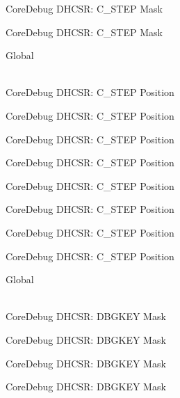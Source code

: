\begin{DoxyRefList}
\label{deprecated__deprecated000487}%
%
Core\+Debug DHCSR\+: C\+\_\+\+STEP Mask 

\label{deprecated__deprecated000589}%
%
Core\+Debug DHCSR\+: C\+\_\+\+STEP Mask  
\item[{\parbox[t]{\linewidth}{Global \doxylink{group___c_m_s_i_s___core_debug_gae1fc39e80de54c0339cbb1b298a9f0f9}{Core\+Debug\+\_\+\+DHCSR\+\_\+\+C\+\_\+\+STEP\+\_\+\+Pos} }}]\hfill \\
\label{deprecated__deprecated000035}%
%
Core\+Debug DHCSR\+: C\+\_\+\+STEP Position 

\label{deprecated__deprecated000123}%
%
Core\+Debug DHCSR\+: C\+\_\+\+STEP Position 

\label{deprecated__deprecated000179}%
%
Core\+Debug DHCSR\+: C\+\_\+\+STEP Position 

\label{deprecated__deprecated000262}%
%
Core\+Debug DHCSR\+: C\+\_\+\+STEP Position 

\label{deprecated__deprecated000321}%
%
Core\+Debug DHCSR\+: C\+\_\+\+STEP Position 

\label{deprecated__deprecated000397}%
%
Core\+Debug DHCSR\+: C\+\_\+\+STEP Position 

\label{deprecated__deprecated000486}%
%
Core\+Debug DHCSR\+: C\+\_\+\+STEP Position 

\label{deprecated__deprecated000588}%
%
Core\+Debug DHCSR\+: C\+\_\+\+STEP Position  
\item[{\parbox[t]{\linewidth}{Global \doxylink{group___c_m_s_i_s___core_debug_ga1ce997cee15edaafe4aed77751816ffc}{Core\+Debug\+\_\+\+DHCSR\+\_\+\+DBGKEY\+\_\+\+Msk} }}]\hfill \\
\label{deprecated__deprecated000006}%
%
Core\+Debug DHCSR\+: DBGKEY Mask 

\label{deprecated__deprecated000106}%
%
Core\+Debug DHCSR\+: DBGKEY Mask 

\label{deprecated__deprecated000160}%
%
Core\+Debug DHCSR\+: DBGKEY Mask 

\label{deprecated__deprecated000245}%
%
Core\+Debug DHCSR\+: DBGKEY Mask 


\end{DoxyRefList}
